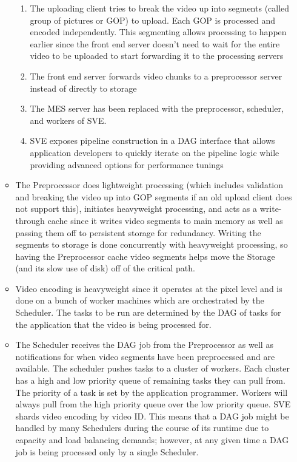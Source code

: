 \documentclass[a4paper]{article}
\begin{document}
\begin{itemize}
\begin{itemize}
\begin{enumerate}
\item The uploading client tries to break the video up into segments (called group of pictures or GOP) to upload. Each GOP is processed and encoded independently. This segmenting allows processing to happen earlier since the front end server doesn't need to wait for the entire video to be uploaded to start forwarding it to the processing servers

\item The front end server forwards video chunks to a preprocessor server instead of directly to storage

\item The MES server has been replaced with the preprocessor, scheduler, and workers of SVE.

\item SVE exposes pipeline
construction in a DAG interface that allows application developers
to quickly iterate on the pipeline logic while providing
advanced options for performance tunings
\end{enumerate}

\item The Preprocessor does lightweight processing (which includes validation and breaking the video up into GOP segments if an old upload client does not support this), initiates heavyweight processing, and acts as a write-through cache since it writes video segments to main memory as well as passing them off to persistent storage for redundancy. Writing the segments to storage is done concurrently with heavyweight processing, so having the Preprocessor cache video segments helps move the Storage (and its slow use of disk) off of the critical path.

\item Video encoding is heavyweight since it operates at the pixel level and is done on a bunch of worker machines which are orchestrated by the Scheduler. The tasks to be run are determined by the DAG of tasks for the application that the video is being processed for.

\item The Scheduler receives the DAG job from the Preprocessor as well as notifications for when video segments have been preprocessed and are available. The scheduler pushes tasks to a cluster of workers. Each cluster has a high and low priority queue of remaining tasks they can pull from. The priority of a task is set by the application programmer. Workers will always pull from the high priority queue over the low priority queue. SVE shards video encoding by video ID. This means that a DAG job might be handled by many Schedulers during the course of its runtime due to capacity and load balancing demands; however, at any given time a DAG job is being processed only by a single Scheduler. 


\end{itemize}
\end{itemize}
\end{document}
